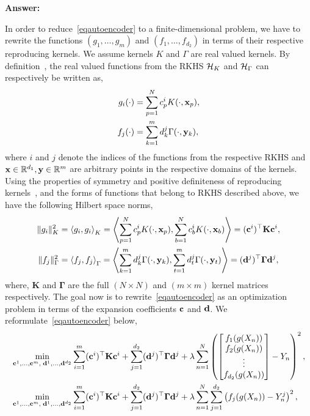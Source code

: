 {\bf Answer:}

In order to reduce~\eqref{eqautoencoder} to a finite-dimensional problem, we have to rewrite the functions $(g_1,\dots,g_m)$ and $(f_1,\dots,f_{d_2})$ in terms of their respective reproducing kernels. We assume kernels $K$ and $\Gamma$ are real valued kernels. By definition~\cite[Chapter 2.3]{fasshauer2015kernel}, the real valued functions from the RKHS $\mathcal{H}_K$ and $\mathcal{H}_\Gamma$ can respectively be written as,
\begin{align}
g_i(\cdot) &= \sum\limits_{p=1}^{N} c^i_p K(\cdot, \mathbf{x}_p), \\
f_j(\cdot) &= \sum\limits_{k=1}^{m} d^j_k \Gamma(\cdot, \mathbf{y}_k),
\end{align}
where $i$ and $j$ denote the indices of the functions from the respective RKHS and $\mathbf{x} \in \mathbb{R}^{d_1}, \mathbf{y} \in \mathbb{R}^m$ are arbitrary points in the respective domains of the kernels. Using the properties of symmetry and positive definiteness of reproducing kernels~\cite[Chapter 2.3]{fasshauer2015kernel}, and the forms of functions that belong to RKHS described above, we have the following Hilbert space norms,
\begin{align}
\|g_i\|_K^2 &= \left\langle g_i, g_i \right\rangle_K = \left\langle \sum\limits_{p=1}^{N} c^i_p K(\cdot, \mathbf{x}_p), \sum\limits_{b=1}^{N} c^i_b K(\cdot, \mathbf{x}_b) \right\rangle =  (\mathbf{c}^i)^\top \mathbf{K} \mathbf{c}^i, \\
\|f_j\|_\Gamma^2 &= \left\langle f_j, f_j \right\rangle_{\Gamma} = \left\langle \sum\limits_{k=1}^{m} d^j_k \Gamma(\cdot, \mathbf{y}_k), \sum\limits_{t=1}^{m} d^j_t \Gamma(\cdot, \mathbf{y}_t) \right\rangle =  (\mathbf{d}^j)^\top \mathbf{\Gamma} \mathbf{d}^j,
\end{align}
where, $\mathbf{K}$ and $\mathbf{\Gamma}$ are the full $(N\times N)$ and $(m\times m)$ kernel matrices respectively. The goal now is to rewrite~\eqref{eqautoencoder} as an optimization problem in terms of the expansion coefficients $\mathbf{c}$ and $\mathbf{d}$. We reformulate~\eqref{eqautoencoder} below,
\begin{align}
&\min_{\mathbf{c}^1,\ldots,\mathbf{c}^m,\; \mathbf{d}^1,\ldots,\mathbf{d}^{d_2}} 
\sum_{i=1}^m (\mathbf{c}^i)^\top \mathbf{K} \mathbf{c}^i
+ \sum_{j=1}^{d_2} (\mathbf{d}^j)^\top \mathbf{\Gamma} \mathbf{d}^j
+ \lambda \sum\limits_{n=1}^{N} \left( \begin{bmatrix}
f_1(g(X_n)) \\ 
f_2(g(X_n)) \\ 
\vdots \\
f_{d_2}(g(X_n))
\end{bmatrix} - Y_n \right)^2, \\
&\min_{\mathbf{c}^1,\ldots,\mathbf{c}^m,\; \mathbf{d}^1,\ldots,\mathbf{d}^{d_2}} 
\sum_{i=1}^m (\mathbf{c}^i)^\top \mathbf{K} \mathbf{c}^i
+ \sum_{j=1}^{d_2} (\mathbf{d}^j)^\top \mathbf{\Gamma} \mathbf{d}^j
+ \lambda \sum\limits_{n=1}^N \sum\limits_{j=1}^{d_2} \left( f_j(g(X_n)) - Y^j_n \right)^2, \label{eq:sumexpansion}
\end{align}
